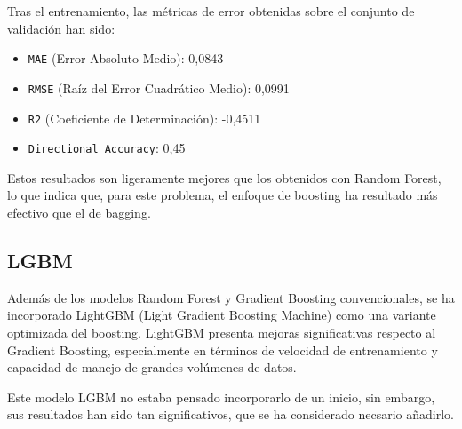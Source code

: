 \begin{enumerate}
    Tras el entrenamiento, las métricas de error obtenidas sobre el conjunto de validación han sido:

    \begin{itemize}
        \item \texttt{MAE} (Error Absoluto Medio): 0,0843
        \item \texttt{RMSE} (Raíz del Error Cuadrático Medio): 0,0991
        \item \texttt{R2} (Coeficiente de Determinación): -0,4511
        \item \texttt{Directional Accuracy}: 0,45
    \end{itemize}

    Estos resultados son ligeramente mejores que los obtenidos con Random Forest, lo que indica que, para este problema, el enfoque de boosting ha resultado más efectivo que el de bagging.
\end{enumerate}

\subsection{LGBM}
Además de los modelos Random Forest y Gradient Boosting convencionales, se ha incorporado LightGBM (Light Gradient Boosting Machine) \cite{lightgbm} como una variante optimizada del boosting. LightGBM presenta mejoras significativas respecto al Gradient Boosting, especialmente en términos de velocidad de entrenamiento y capacidad de manejo de grandes volúmenes de datos.

Este modelo LGBM no estaba pensado incorporarlo de un inicio, sin embargo, sus resultados han sido tan significativos, que se ha considerado necsario añadirlo.

